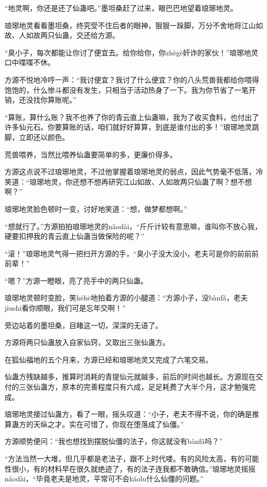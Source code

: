 \begin{this_body}
“地灵啊，你还是还了仙蛊吧。”墨坦桑赶了过来，眼巴巴地望着琅琊地灵。

琅琊地灵看看墨坦桑，终究受不住后者的眼神，狠狠一跺脚，万分不舍地将江山如故、人如故两只仙蛊，交还给方源。

“臭小子，每次都能让你讨了便宜去。给你给你，你zhègè奸诈的家伙！”琅琊地灵口中喋喋不休。

方源不悦地冷哼一声：“我讨便宜？我讨了什么便宜？你的八头荒兽我都给你喂得饱饱的，什么惨斗都没有发生，只相当于活动热身了一下。我为你节省了一笔开销，还没找你算账呢。”

“算账，算什么账？我不也养了你的青云直上仙蛊嘛，我为了收买食料，也付出了许多仙元石。你要算账的话，咱们就好好算算，到底是谁付出的多！”琅琊地灵跳脚，立即还以颜色。

荒兽喂养，当然比喂养仙蛊要简单的多，更廉价得多。

方源这点说不过琅琊地灵，不过他掌握着琅琊地灵的弱点，因此气势毫不低落，冷笑道：“琅琊地灵，你还想不想再研究江山如故、人如故两只仙蛊了啊？想不想啊？”

琅琊地灵脸色顿时一变，讨好地笑道：“想，做梦都想啊。”

“想就行了。”方源拍拍琅琊地灵的nǎodài，“斤斤计较有意思嘛，谁叫你不放心我，硬要扣押我的青云直上仙蛊当做保险的呢？”

“滚！”琅琊地灵气得一把扫开方源的手，“臭小子没大没小，老夫可是你的前前前前辈！”

“嗯？”方源一瞪眼，亮了亮手中的两只仙蛊。

琅琊地灵顿时变脸，笑hēhē地拍着方源的小腿道：“方源小子，没bànfǎ，老夫jiushi看你顺眼，我们可是忘年交啊！”

旁边站着的墨坦桑，目睹这一切，深深的无语了。

方源将两只仙蛊放入自家仙窍，又取出三张仙蛊方。

在狐仙福地的五个月来，方源已经和琅琊地灵又完成了六笔交易。

仙蛊方残缺越多，推算时消耗的青提仙元就越多，前后的时间也越长。方源现在交付的三张仙蛊方，原本的完善程度只有六成，足足耗费了大半个月，这才勉强完成。

琅琊地灵接过仙蛊方，看了一眼，摇头叹道：“小子，老夫不得不说，你的确是推算蛊方的天纵之才。实在可惜了，你现在堕落成了仙僵。”

方源顺势便问：“我也想找到摆脱仙僵的法子，你这就没有bànfǎ吗？”

“方法当然一大堆，但几乎都是老法子，跟不上时代喽。有的风险太高，有的可能性很小，有的材料早在很久就绝迹了，有的法子连我都不敢确信。”琅琊地灵摇摇nǎodài，“毕竟老夫是地灵，平常可不会kǎolu什么仙僵的问题。”


\end{this_body}
